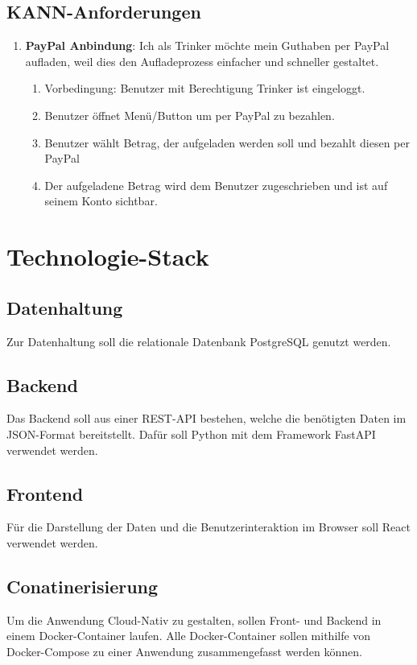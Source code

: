 \documentclass[conference,a4paper]{cs-techrep}
\begin{document}
\subsection{KANN-Anforderungen}

\begin{enumerate}[{USC}1]

\item \textbf{PayPal Anbindung}: Ich als Trinker möchte mein Guthaben per PayPal aufladen, weil dies den Aufladeprozess einfacher und schneller gestaltet.
\begin{enumerate}
	\item Vorbedingung: Benutzer mit Berechtigung Trinker ist eingeloggt.
	\item Benutzer öffnet Menü/Button um per PayPal zu bezahlen.
	\item Benutzer wählt Betrag, der aufgeladen werden soll und bezahlt diesen per PayPal
	\item Der aufgeladene Betrag wird dem Benutzer zugeschrieben und ist auf seinem Konto sichtbar.
\end{enumerate}

\end{enumerate}

\section{Technologie-Stack}
\subsection{Datenhaltung}
Zur Datenhaltung soll die relationale Datenbank PostgreSQL genutzt werden.
\subsection{Backend}
Das Backend soll aus einer REST-API bestehen, welche die benötigten Daten im JSON-Format bereitstellt. Dafür soll Python mit dem Framework FastAPI verwendet werden.
\subsection{Frontend}
Für die Darstellung der Daten und die Benutzerinteraktion im Browser soll React verwendet werden.
\subsection{Conatinerisierung}
Um die Anwendung Cloud-Nativ zu gestalten, sollen Front- und Backend in einem Docker-Container laufen. Alle Docker-Container sollen mithilfe von Docker-Compose zu einer Anwendung zusammengefasst werden können.
\end{document}
